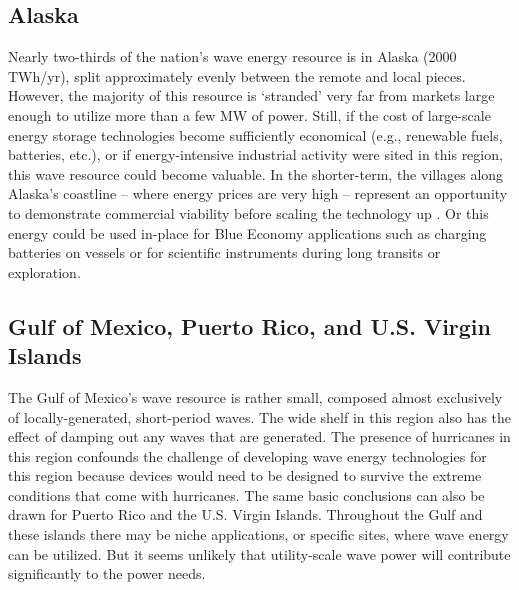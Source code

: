 \subsection{Alaska}

Nearly two-thirds of the nation's wave energy resource is in Alaska (2000 TWh/yr), split approximately evenly between the remote and local pieces. However, the majority of this resource is `stranded' very far from markets large enough to utilize more than a few MW of power. Still, if the cost of large-scale energy storage technologies become sufficiently economical (e.g., renewable fuels, batteries, etc.), or if energy-intensive industrial activity were sited in this region, this wave resource could become valuable. In the shorter-term, the villages along Alaska's coastline -- where energy prices are very high -- represent an opportunity to demonstrate commercial viability before scaling the technology up \cite{alaskaenergyauthority2019PowerCost2020}. Or this energy could be used in-place for Blue Economy applications such as charging batteries on vessels or for scientific instruments during long transits or exploration. 

\subsection{Gulf of Mexico, Puerto Rico, and U.S. Virgin Islands}

The Gulf of Mexico's wave resource is rather small, composed almost exclusively of locally-generated, short-period waves.  The wide shelf in this region also has the effect of damping out any waves that are generated. The presence of hurricanes in this region confounds the challenge of developing wave energy technologies for this region because devices would need to be designed to survive the extreme conditions that come with hurricanes. The same basic conclusions can also be drawn for Puerto Rico and the U.S. Virgin Islands. Throughout the Gulf and these islands there may be niche applications, or specific sites, where wave energy can be utilized. But it seems unlikely that utility-scale wave power will contribute significantly to the power needs.


